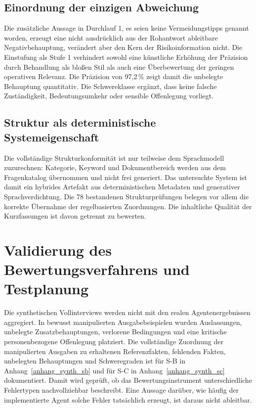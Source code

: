 \documentclass[
  10pt,
  ngerman,
  a4paper,
  toc=graduated,
  numbers=noenddot,
  headings=standardclasses,
  nonumberlist
]{scrartcl}
\newcommand{\pct}[1]{#1\,\%}
\begin{document}
\subsection{Einordnung der einzigen Abweichung}

Die zusätzliche Aussage in Durchlauf 1, es seien keine Vermeidungstipps genannt worden, erzeugt eine nicht ausdrücklich aus der Rohantwort ableitbare Negativbehauptung, verändert aber den Kern der Risikoinformation nicht. Die Einstufung als Stufe 1 verhindert sowohl eine künstliche Erhöhung der Präzision durch Behandlung als bloßen Stil als auch eine Überbewertung der geringen operativen Relevanz. Die Präzision von \pct{97{,}2} zeigt damit die unbelegte Behauptung quantitativ. Die Schwereklasse ergänzt, dass keine falsche Zuständigkeit, Bedeutungsumkehr oder sensible Offenlegung vorliegt.

\subsection{Struktur als deterministische Systemeigenschaft}

Die vollständige Strukturkonformität ist nur teilweise dem Sprachmodell zuzurechnen: Kategorie, Keyword und Dokumentbereich werden aus dem Fragenkatalog übernommen und nicht frei generiert. Das untersuchte System ist damit ein hybrides Artefakt aus deterministischen Metadaten und generativer Sprachverdichtung. Die 78 bestandenen Strukturprüfungen belegen vor allem die korrekte Übernahme der regelbasierten Zuordnungen. Die inhaltliche Qualität der Kurzfassungen ist davon getrennt zu bewerten.

\section{Validierung des Bewertungsverfahrens und Testplanung}

Die synthetischen Vollinterviews werden nicht mit den realen Agentenergebnissen aggregiert. In bewusst manipulierten Ausgabebeispielen wurden Auslassungen, unbelegte Zusatzbehauptungen, verlorene Bedingungen und eine kritische personenbezogene Offenlegung platziert. Die vollständige Zuordnung der manipulierten Ausgaben zu erhaltenen Referenzfakten, fehlenden Fakten, unbelegten Behauptungen und Schweregraden ist für S-B in Anhang~\ref{anhang_synth_sb} und für S-C in Anhang~\ref{anhang_synth_sc} dokumentiert. Damit wird geprüft, ob das Bewertungsinstrument unterschiedliche Fehlertypen nachvollziehbar beschreibt. Eine Aussage darüber, wie häufig der implementierte Agent solche Fehler tatsächlich erzeugt, ist daraus nicht ableitbar.
\end{document}
